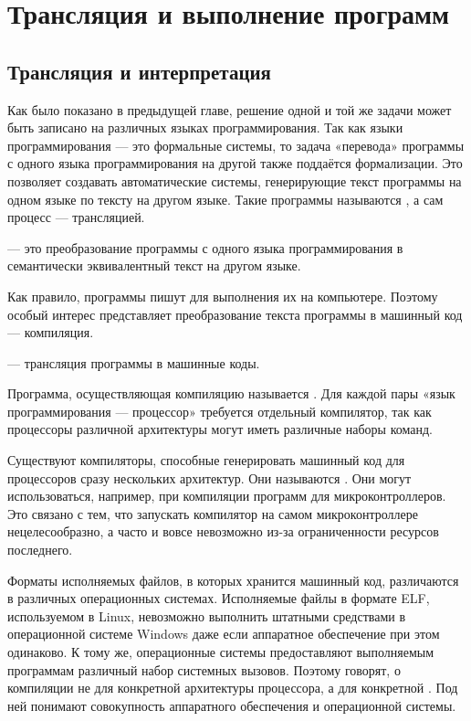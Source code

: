 \chapter{Трансляция и выполнение программ}

\section{Трансляция и интерпретация}


Как было показано в предыдущей главе, решение одной и той же задачи
может быть записано на различных языках программирования. Так как
языки программирования — это формальные системы, то задача «перевода»
программы с одного языка программирования на другой также поддаётся
формализации. Это позволяет создавать автоматические системы,
генерирующие текст программы на одном языке по тексту на другом
языке. Такие программы называются , а
сам процесс — трансляцией.

\begin{defn}
   — это преобразование программы с
  одного языка программирования в семантически эквивалентный текст на
  другом языке.
\end{defn}

Как правило, программы пишут для выполнения их на компьютере. Поэтому
особый интерес представляет преобразование текста программы в машинный
код — компиляция.

\begin{defn}
   — трансляция программы в машинные
  коды.
\end{defn}

Программа, осуществляющая компиляцию называется
.  Для каждой пары «язык
  программирования — процессор» требуется отдельный компилятор, так
как процессоры различной архитектуры могут иметь различные наборы
команд.

Существуют компиляторы, способные генерировать машинный код для
процессоров сразу нескольких архитектур. Они называются
.  Они могут
использоваться, например, при компиляции программ для
микроконтроллеров.  Это связано с тем, что запускать компилятор на
самом микроконтроллере нецелесообразно, а часто и вовсе невозможно
из-за ограниченности ресурсов последнего.

Форматы исполняемых файлов, в которых хранится машинный код,
различаются в различных операционных системах. Исполняемые файлы в
формате ELF, используемом в Linux, невозможно выполнить штатными
средствами в операционной системе Windows даже если аппаратное
обеспечение при этом одинаково. К тому же, операционные системы
предоставляют выполняемым программам различный набор системных
вызовов. Поэтому говорят, о компиляции не для конкретной архитектуры
процессора, а для конкретной
. Под ней понимают совокупность аппаратного обеспечения и
операционной системы.

